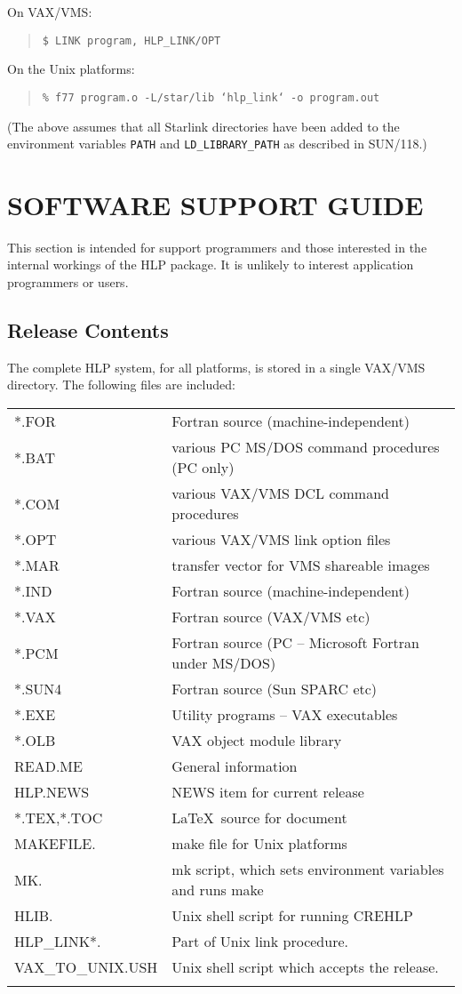 On VAX/VMS:
\begin{verse}
{\tt \$ LINK program, HLP\_LINK/OPT}
\end{verse}

On the Unix platforms:\begin{verse}
{\tt \% f77 program.o -L/star/lib `hlp\_link` -o program.out}
\end{verse}
(The above assumes that all Starlink directories
have been added to the environment variables {\tt PATH} and
{\tt LD\_LIBRARY\_PATH} as described in SUN/118.)

\section{SOFTWARE SUPPORT GUIDE}
This section is intended for support programmers and those interested
in the internal workings of the HLP package.  It is unlikely to
interest application programmers or users.

\subsection{Release Contents}
The complete HLP system, for all platforms,
is stored in a single VAX/VMS directory.
The following files are included:

\begin{tabular}{ll}
\\
 *.FOR & Fortran source (machine-independent) \\
 *.BAT & various PC MS/DOS command procedures (PC only)\\
 *.COM & various VAX/VMS DCL command procedures \\
 *.OPT & various VAX/VMS link option files \\
 *.MAR & transfer vector for VMS shareable images \\
 *.IND & Fortran source (machine-independent) \\
 *.VAX & Fortran source (VAX/VMS etc) \\
 *.PCM & Fortran source (PC -- Microsoft Fortran under MS/DOS) \\
 *.SUN4 & Fortran source (Sun SPARC etc) \\
 *.EXE & Utility programs -- VAX executables \\
 *.OLB & VAX object module library \\
 READ.ME & General information \\
 HLP.NEWS & NEWS item for current release \\
 *.TEX,*.TOC & \LaTeX\ source for document \\
 MAKEFILE. & make file for Unix platforms \\
 MK. & mk script, which sets environment variables and runs make \\
 HLIB. & Unix shell script for running CREHLP \\
 HLP\_LINK*. & Part of Unix link procedure. \\
 VAX\_TO\_UNIX.USH & Unix shell script which accepts the release. \\ \\
\end{tabular}

